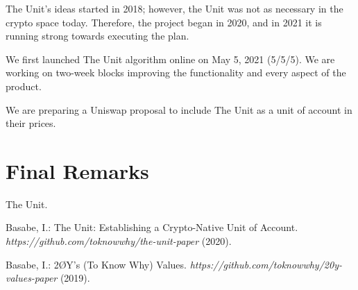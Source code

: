 \documentclass[12pt]{article}
\begin{document}
The Unit's ideas started in 2018; however, the Unit was not as necessary in the crypto space today. Therefore, the project began in 2020, and in 2021 it is running strong towards executing the plan.

We first launched The Unit algorithm online on May 5, 2021 (5/5/5). We are working on two-week blocks improving the functionality and every aspect of the product.

We are preparing a Uniswap proposal to include The Unit as a unit of account in their prices.

\section{Final Remarks}

The Unit.


\begin{thebibliography}{[BLSWZ9]}


 Basabe, I.: The Unit: Establishing a Crypto-Native Unit of Account. \emph{https://github.com/toknowwhy/the-unit-paper} (2020).


 Basabe, I.: 2ØY's (To Know Why) Values. \emph{https://github.com/toknowwhy/20y-values-paper} (2019).



\end{thebibliography}
\end{document}
